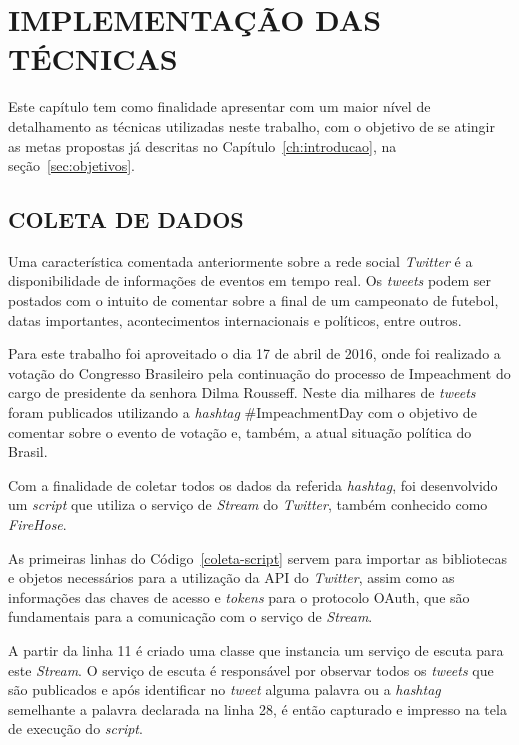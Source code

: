 \chapter{IMPLEMENTAÇÃO DAS TÉCNICAS}\label{ch:implementacao}

Este capítulo tem como finalidade apresentar com um maior nível de detalhamento as técnicas utilizadas neste trabalho, com o objetivo de se atingir as metas propostas já descritas no Capítulo~\ref{ch:introducao}, na seção~\ref{sec:objetivos}.

\section{COLETA DE DADOS}
Uma característica comentada anteriormente sobre a rede social \textit{Twitter} é a disponibilidade de informações de eventos em tempo real. Os \textit{tweets} podem ser postados com o intuito de comentar sobre a final de um campeonato de futebol, datas importantes, acontecimentos internacionais e políticos, entre outros.

Para este trabalho foi aproveitado o dia 17 de abril de 2016, onde foi realizado a votação do Congresso Brasileiro pela continuação do processo de Impeachment do cargo de presidente da senhora Dilma Rousseff. Neste dia milhares de \textit{tweets} foram publicados utilizando a \textit{hashtag} \#ImpeachmentDay com o objetivo de comentar sobre o evento de votação e, também, a atual situação política do Brasil.

Com a finalidade de coletar todos os dados da referida \textit{hashtag}, foi desenvolvido um \textit{script} que utiliza o serviço de \textit{Stream} do \textit{Twitter}, também conhecido como \textit{FireHose}.

As primeiras linhas do Código~\ref{coleta-script} servem para importar as bibliotecas e objetos necessários para a utilização da API do \textit{Twitter}, assim como as informações das chaves de acesso e \textit{tokens} para o protocolo OAuth, que são fundamentais para a comunicação com o serviço de \textit{Stream}.



A partir da linha 11 é criado uma classe que instancia um serviço de escuta para este \textit{Stream}. O serviço de escuta é responsável por observar todos os \textit{tweets} que são publicados e após identificar no \textit{tweet} alguma palavra ou a \textit{hashtag} semelhante a palavra declarada na linha 28, é então capturado e impresso na tela de execução do \textit{script}.

